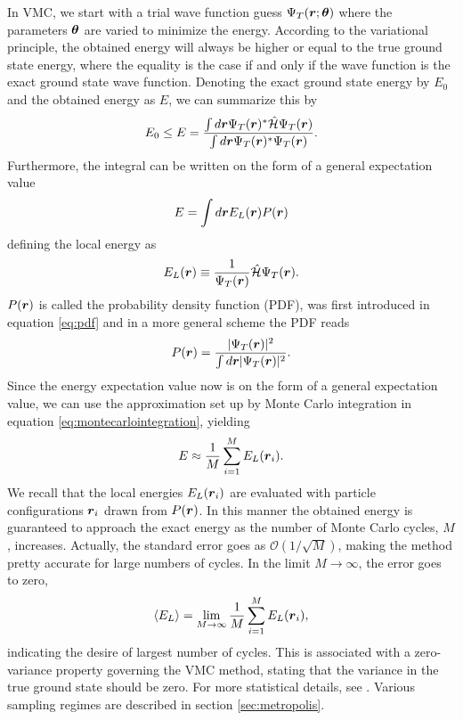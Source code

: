 In VMC, we start with a trial wave function guess $\Psi_T(\boldsymbol{{r}};\boldsymbol{{\theta}})$ where the parameters $\boldsymbol{{\theta}}$ are varied to minimize the energy. According to the variational principle, the obtained energy will always be higher or equal to the true ground state energy, where the equality is the case if and only if the wave function is the exact ground state wave function. Denoting the exact ground state energy by $E_0$ and the obtained energy as $E$, we can summarize this by
\begin{equation}
E_0 \leq E = \frac{\int d\boldsymbol{{r}}\Psi_T(\boldsymbol{{r}})^*\hat{\mathcal{H}}\Psi_T(\boldsymbol{{r}})}{\int d\boldsymbol{{r}}\Psi_T(\boldsymbol{{r}})^*\Psi_T(\boldsymbol{{r}})}.
\end{equation}
Furthermore, the integral can be written on the form of a general expectation value
\begin{equation}
E = \int d\boldsymbol{{r}} E_L(\boldsymbol{{r}})P(\boldsymbol{{r}})
\end{equation}
defining the local energy as
\begin{equation}
E_L(\boldsymbol{{r}})\equiv\frac{1}{\Psi_T(\boldsymbol{{r}})}\hat{\mathcal{H}}\Psi_T(\boldsymbol{{r}})
\label{eq:localenergy}.
\end{equation}
$P(\boldsymbol{{r}})$ is called the probability density function (PDF), was first introduced in equation \eqref{eq:pdf} and in a more general scheme the PDF reads
\begin{equation}
P(\boldsymbol{{r}})=\frac{|\Psi_T(\boldsymbol{{r}})|^2}{\int d\boldsymbol{{r}}|\Psi_T(\boldsymbol{{r}})|^2}.
\label{eq:probvmc}
\end{equation}
Since the energy expectation value now is on the form of a general expectation value, we can use the approximation set up by Monte Carlo integration in equation \eqref{eq:montecarlointegration}, yielding 
\begin{equation}
E \approx \frac{1}{M}\sum_{i=1}^ME_L(\boldsymbol{{r}}_i) \label{eq:energysum}.
\end{equation}
We recall that the local energies $E_L(\boldsymbol{{r}}_i)$ are evaluated with particle configurations $\boldsymbol{{r}}_i$ drawn from $P(\boldsymbol{{r}})$. In this manner the obtained energy is guaranteed to approach the exact energy as the number of Monte Carlo cycles, $M$, increases. Actually, the standard error goes as $\mathcal{O}(1/\sqrt{M})$, making the method pretty accurate for large numbers of cycles. In the limit $M\rightarrow\infty$, the error goes to zero,
\begin{equation}
\langle E_L\rangle=\lim_{M\to\infty} \frac{1}{M}\sum_{i=1}^ME_L(\boldsymbol{{r}}_i),
\end{equation}
indicating the desire of largest number of cycles. This is associated with a zero-variance property governing the VMC method, stating that the variance in the true ground state should be zero. For more statistical details, see \cite{deb_variational_2014}. Various sampling regimes are described in section \ref{sec:metropolis}.

